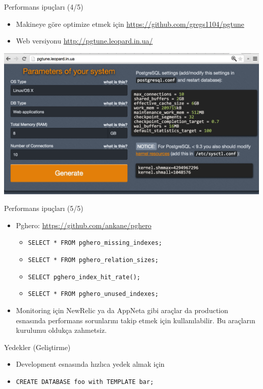 \documentclass[presentation]{beamer}
\begin{document}
\begin{frame}[label=sec-16]{Performans ipuçları (4/5)}
\begin{itemize}
\item Makineye göre optimize etmek için \url{https://github.com/gregs1104/pgtune}
\item Web versiyonu \url{http://pgtune.leopard.in.ua/}
\end{itemize}

\includegraphics[width=.9\linewidth]{./pgtune.png}
\end{frame}


\begin{frame}[fragile,label=sec-17]{Performans ipuçları (5/5)}
 \begin{itemize}
\item Pghero: \url{https://github.com/ankane/pghero}
\begin{itemize}
\item \texttt{SELECT * FROM pghero\_missing\_indexes;}
\item \texttt{SELECT * FROM pghero\_relation\_sizes;}
\item \texttt{SELECT pghero\_index\_hit\_rate();}
\item \texttt{SELECT * FROM pghero\_unused\_indexes;}
\end{itemize}
\item Monitoring için NewRelic ya da AppNeta gibi araçlar da production esnasında
performans sorunlarını takip etmek için kullanılabilir. Bu araçların kurulumu
oldukça zahmetsiz.
\end{itemize}
\end{frame}

\begin{frame}[fragile,label=sec-18]{Yedekler (Geliştirme)}
 \begin{itemize}
\item Development esnasında hızlıca yedek almak için

\item \texttt{CREATE DATABASE foo with TEMPLATE bar;}
\end{itemize}
\end{frame}
\end{document}
